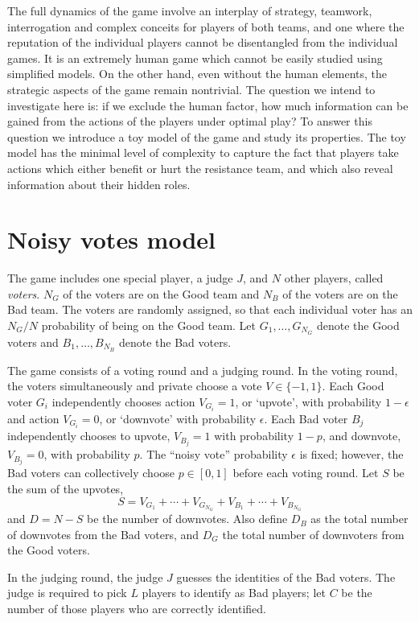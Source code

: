 \documentclass[11pt]{article}
\begin{document}
The full dynamics of the game involve an interplay of strategy,
teamwork, interrogation and complex conceits for players of both
teams, and one where the reputation of the individual players cannot
be disentangled from the individual games.  It is an extremely human
game which cannot be easily studied using simplified models.  On the
other hand, even without the human elements, the strategic aspects of
the game remain nontrivial.  The question we intend to investigate
here is: if we exclude the human factor, how much information can be
gained from the actions of the players under optimal play?  To answer
this question we introduce a toy model of the game and study its
properties.  The toy model has the minimal level of complexity to
capture the fact that players take actions which either benefit or
hurt the resistance team, and which also reveal information about
their hidden roles.

\section{Noisy votes model}

The game includes one special player, a judge $J$, and $N$ other
players, called \emph{voters}.  $N_G$ of the voters are on the Good
team and $N_B$ of the voters are on the Bad team.  The voters are
randomly assigned, so that each individual voter has an $N_G/N$
probability of being on the Good team.  Let $G_1,\hdots, G_{N_G}$
denote the Good voters and $B_1,\hdots,B_{N_B}$ denote the Bad voters.

The game consists of a voting round and a judging round.  In the
voting round, the voters simultaneously and private choose a vote $V
\in \{-1, 1\}$. Each Good voter $G_i$ independently chooses action
$V_{G_i}=1$, or `upvote', with probability $1-\epsilon$ and action
$V_{G_i}=0$, or `downvote' with probability $\epsilon$.  Each Bad
voter $B_j$ independently chooses to upvote, $V_{B_j}=1$ with
probability $1-p$, and downvote, $V_{B_j}=0$, with probability $p$.
The ``noisy vote'' probability $\epsilon$ is fixed; however, the Bad
voters can collectively choose $p \in [0,1]$ before each voting round.
Let $S$ be the sum of the upvotes,
\[
S =V_{G_1} + \cdots + V_{G_{N_G}} + V_{B_1} + \cdots + V_{B_{N_G}}
\]
and $D = N-S$ be the number of downvotes.  Also define $D_B$ as the
total number of downvotes from the Bad voters, and $D_G$ the total
number of downvoters from the Good voters.

In the judging round, the judge $J$ guesses the identities of the Bad
voters.  The judge is required to pick $L$ players to identify as
Bad players; let $C$ be the number of those players who are correctly
identified.
\end{document}
